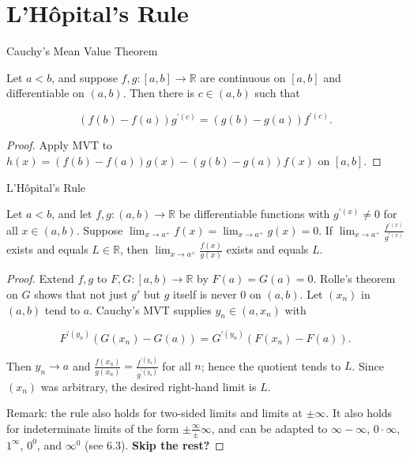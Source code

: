 \section{L'Hôpital's Rule}

\begin{lemma}{Cauchy's Mean Value Theorem}

Let \(a < b\), and suppose \(f,g:\left\lbrack {a,b} \right\rbrack\rightarrow\mathbb{R}\) are continuous on \(\left\lbrack {a,b} \right\rbrack\) and differentiable on \(\left( {a,b} \right)\). Then there is \(c \in \left( {a,b} \right)\) such that

\[\left( {f(b) - f(a)} \right)g^{'{(c)}} = \left( {g(b) - g(a)} \right)f^{'{(c)}}.\]

\end{lemma}

\begin{proof}

Apply MVT to \(h(x) = \left( {f(b) - f(a)} \right)g(x) - \left( {g(b) - g(a)} \right)f(x)\) on \(\left\lbrack {a,b} \right\rbrack\).

\end{proof}

\begin{theorem}{L'Hôpital's Rule}

Let \(a < b\), and let \(f,g:\left( {a,b} \right)\rightarrow\mathbb{R}\) be differentiable functions with \(g^{'{(x)}} \neq 0\) for all \(x \in \left( {a,b} \right)\). Suppose \(\lim_{x\rightarrow a^{+}}f(x) = \lim_{x\rightarrow a^{+}}g(x) = 0\). If \(\lim_{x\rightarrow a^{+}}\frac{f^{'{(x)}}}{g^{'{(x)}}}\) exists and equals \(L \in \mathbb{R}\), then \(\lim_{x\rightarrow a^{+}}\frac{f(x)}{g(x)}\) exists and equals \(L\).

\end{theorem}

\begin{proof}

Extend \(f,g\) to \(F,G:\left\lbrack {a,b} \right)\rightarrow\mathbb{R}\) by \(F(a) = G(a) = 0\). Rolle's theorem on \(G\) shows that not just \(g'\) but \(g\) itself is never \(0\) on \(\left( {a,b} \right)\). Let \(\left( x_{n} \right)\) in \(\left( {a,b} \right)\) tend to \(a\). Cauchy's MVT supplies \(y_{n} \in \left( {a,x_{n}} \right)\) with

\[F^{'{(y_{n})}}\left( {G\left( x_{n} \right) - G(a)} \right) = G^{'{(y_{n})}}\left( {F\left( x_{n} \right) - F(a)} \right).\]

Then \(y_{n}\rightarrow a\) and \(\frac{f\left( x_{n} \right)}{g\left( x_{n} \right)} = \frac{f^{'{(y_{n})}}}{g^{'{(y_{n})}}}\) for all \(n\); hence the quotient tends to \(L\). Since \(\left( x_{n} \right)\) was arbitrary, the desired right-hand limit is \(L\).

Remark: the rule also holds for two-sided limits and limits at \(\pm \infty\). It also holds for indeterminate limits of the form \(\pm \frac{\infty}{\pm}\infty\), and can be adapted to \(\infty - \infty\), \(0 \cdot \infty\), \(1^{\infty}\), \(0^{0}\), and \(\infty^{0}\) (see 6.3). \textbf{Skip the rest?}

\end{proof}

